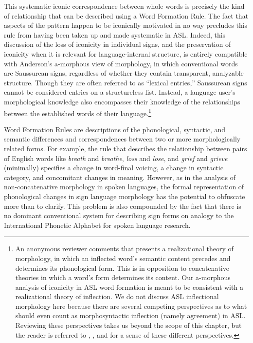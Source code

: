 \documentclass[output=paper,
modfonts
]{LSP/langsci}
\begin{document}
  This systematic iconic correspondence between whole words is precisely the kind of relationship that can be described using a Word Formation Rule. The fact that aspects of the pattern happen to be iconically motivated in no way precludes this rule from having been taken up and made systematic in ASL. Indeed, this discussion of the loss of iconicity in individual signs, and the preservation of iconicity when it is relevant for language-internal structure, is entirely compatible with Anderson's a-morphous view of morphology, in which conventional words are Saussurean signs, regardless of whether they contain transparent, analyzable structure. Though they are often referred to as ``lexical entries,'' Saussurean signs cannot be considered entries on a structureless list. Instead, a language user's morphological knowledge also encompasses their knowledge of the relationships between the established words of their language.\footnote{An anonymous reviewer comments that \citet{anderson1992} presents a realizational theory of morphology, in which an inflected word's semantic content precedes and determines its phonological form. This is in opposition to concatenative theories in which a word's form determines its content. Our a-morphous analysis of iconicity in ASL word formation is meant to be consistent with a realizational theory of inflection. We do not discuss ASL inflectional morphology here because there are several competing perspectives as to what should even count as morphosyntactic inflection (namely agreement) in ASL. Reviewing these perspectives takes us beyond the scope of this chapter, but the reader is referred to \citet{LilloMartin2011}, \citet{Wilbur2013}, and \citet{Wilcox2016} for a sense of these different perspectives.}

Word Formation Rules are descriptions of the phonological, syntactic, and semantic differences and correspondences between two or more morphologically related forms. For example, the rule that describes the relationship between pairs of English words like \textit{breath} and \textit{breathe}, \textit{loss} and \textit{lose}, and \textit{grief} and\textit{ grieve} (minimally) specifies a change in word-final voicing, a change in syntactic category, and concomitant changes in meaning. However, as in the analysis of non-concatenative morphology in spoken languages, the formal representation of phonological changes in sign language morphology has the potential to obfuscate more than to clarify. This problem is also compounded by the fact that there is no dominant conventional system for describing sign forms on analogy to the International Phonetic Alphabet for spoken language research.
\end{document}
